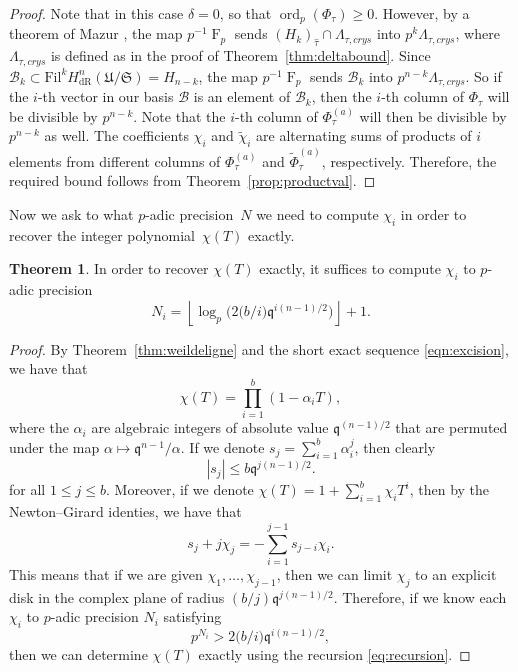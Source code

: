 \documentclass[a4paper,11pt]{article}
\numberwithin{equation}{section}
\providecommand{\floor}[1]{\left\lfloor#1\right\rfloor}   %
\DeclareMathOperator{\ord}{ord}          %
\DeclareMathOperator{\Frob}{F}           %
\providecommand{\HdR}{H_{\text{dR}}}    %
\providecommand{\cB}{\mathcal{B}} %
\theoremstyle{definition}
\newtheorem{thm}{Theorem}[section]
\begin{document}
\begin{proof} 
Note that in this case $\delta=0$, so that $\ord_p(\Phi_{\tau}) \geq 0$. 
However, by a theorem of Mazur \cite{Mazur1972}, the map $p^{-1} \Frob_p$ 
sends $(H_k)_{\hat{\tau}} \cap \Lambda_{\tau,crys}$ into $p^k \Lambda_{\tau,crys}$, 
where $\Lambda_{\tau,crys}$ is defined as in the proof of 
Theorem~\ref{thm:deltabound}. Since 
$\cB_k \subset \mbox{Fil}^{k} \HdR^{n}(\mathfrak{U}/\mathfrak{S}) = H_{n-k}$, 
the map $p^{-1} \Frob_p$ sends $\cB_k$ into $p^{n-k} \Lambda_{\tau,crys}$. 
So if the $i$-th vector in our basis $\cB$ is an element of $\cB_k$, then 
the $i$-th column of $\Phi_{\tau}$ will be divisible by $p^{n-k}$. Note that 
the $i$-th column of $\Phi_{\tau}^{(a)}$ will then be divisible by $p^{n-k}$ 
as well. The coefficients $\chi_i$ and $\tilde{\chi}_i$ are alternating sums 
of products of $i$ elements from different columns of $\Phi_{\tau}^{(a)}$ 
and $\tilde{\Phi}_{\tau}^{(a)}$, respectively.  Therefore, the required bound 
follows from Theorem~\ref{prop:productval}. 
\end{proof}

Now we ask to what $p$-adic precision~$N$ we need to compute $\chi_i$ 
in order to recover the integer polynomial~$\chi(T)$ exactly.

\begin{thm} \label{thm:N0}
In order to recover $\chi(T)$ exactly, it suffices to compute 
$\chi_i$ to $p$-adic precision 
\begin{equation*}
N_i = \floor{\log_p \bigl( 2 \bigl( b/i \bigr) \mathfrak{q}^{i (n-1) / 2} \bigr)}+1.
\end{equation*}
\end{thm}

\begin{proof}
By Theorem~\ref{thm:weildeligne} and the short exact 
sequence \eqref{eqn:excision}, we have that
\[
\chi(T)=\prod_{i=1}^b (1-\alpha_i T),
\]
where the $\alpha_i$ are algebraic integers of absolute 
value $\mathfrak{q}^{(n-1)/2}$ that are permuted under the 
map $\alpha \mapsto \mathfrak{q}^{n-1}/\alpha$. If we denote
$s_j = \sum_{i=1}^{b} \alpha_i^j$, then clearly
\[
|s_j| \leq b \mathfrak{q}^{j (n-1)/2}.
\]
for all $1 \leq j \leq b$. Moreover, if we denote 
$\chi(T) = 1+\sum_{i=1}^{b} \chi_i T^i$, then by the Newton--Girard 
identies, we have that
\begin{equation} \label{eq:recursion}
s_j+j \chi_j = - \sum_{i=1}^{j-1} s_{j-i} \chi_i.
\end{equation}
This means that if we are given $\chi_1,\ldots,\chi_{j-1}$, then 
we can limit $\chi_j$ to an explicit  disk in the complex plane of 
radius $(b/j) \mathfrak{q}^{j (n-1) / 2}$. Therefore, 
if we know each $\chi_i$ to $p$-adic precision $N_i$ satisfying
\[
p^{N_i} > 2 \bigl( b/i \bigr) \mathfrak{q}^{i (n-1) / 2},
\] 
then we can determine $\chi(T)$ exactly using the recursion \eqref{eq:recursion}.
\end{proof}
\end{document}
